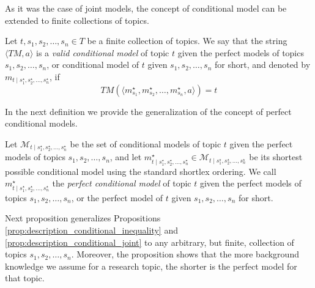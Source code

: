 As it was the case of joint models, the concept of conditional model can be extended to finite collections of topics.

\begin{definition}
Let $t, s_1, s_2, \ldots, s_n \in T$ be a finite collection of topics. We say that the string $\langle TM,a \rangle$ is a \emph{valid conditional model} of topic $t$ given the perfect models of topics $s_1, s_2, \ldots, s_n$, or conditional model of $t$ given $s_1, s_2, \ldots, s_n$ for short, and denoted by $m_{t \mid s_1^\star, s_2^\star, \ldots, s_n^\star}$, if
\[
TM \left(\langle m_{s_1}^\star, m_{s_2}^\star, \ldots, m_{s_n}^\star, a \rangle \right) = t
\]
\end{definition}

In the next definition we provide the generalization of the concept of perfect conditional models.

\begin{definition}
Let $\mathcal{M}_{t \mid s_1^\star, s_2^\star, \ldots, s_n^\star}$ be the set of conditional models of topic $t$ given the perfect models of topics $s_1, s_2, \ldots, s_n$, and let $m_{t \mid s_1^\star, s_2^\star, \ldots, s_n^\star}^\star \in \mathcal{M}_{t \mid s_1^\star, s_2^\star, \ldots, s_n^\star}$ be its shortest possible conditional model using the standard shortlex ordering. We call $m_{t \mid s_1^\star, s_2^\star, \ldots, s_n^\star}^\star$ the \emph{perfect conditional model} of topic $t$ given the perfect models of topics $s_1, s_2, \ldots, s_n$, or the perfect model of $t$ given $s_1, s_2, \ldots, s_n$ for short.
\end{definition}

Next proposition generalizes Propositions \ref{prop:description_conditional_inequality} and \ref{prop:description_conditional_joint} to any arbitrary, but finite, collection of topics $s_1, s_2, \ldots, s_n$. Moreover, the proposition shows that the more background knowledge we assume for a research topic, the shorter is the perfect model for that topic.


